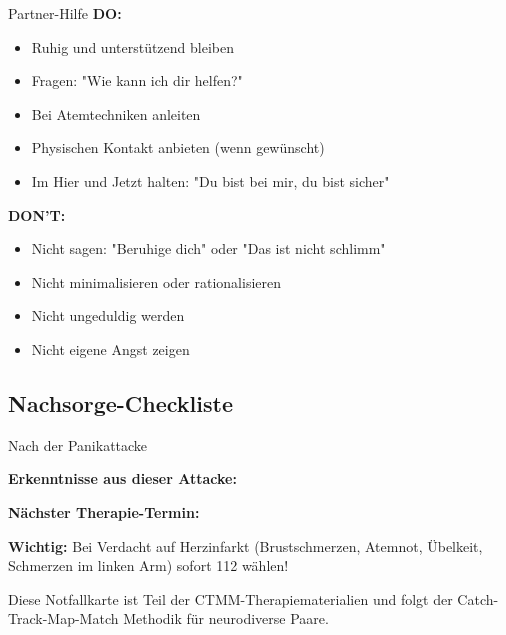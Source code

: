 \begin{ctmmPurpleBox}{Partner-Hilfe}
\textbf{DO:}
\begin{itemize}
\item Ruhig und unterstützend bleiben
\item Fragen: "Wie kann ich dir helfen?"
\item Bei Atemtechniken anleiten
\item Physischen Kontakt anbieten (wenn gewünscht)
\item Im Hier und Jetzt halten: "Du bist bei mir, du bist sicher"
\end{itemize}

\textbf{DON'T:}
\begin{itemize}
\item Nicht sagen: "Beruhige dich" oder "Das ist nicht schlimm"
\item Nicht minimalisieren oder rationalisieren
\item Nicht ungeduldig werden
\item Nicht eigene Angst zeigen
\end{itemize}
\end{ctmmPurpleBox}

\subsection{Nachsorge-Checkliste}

\begin{ctmmGreenBox}{Nach der Panikattacke}





\textbf{Erkenntnisse aus dieser Attacke:} 

\textbf{Nächster Therapie-Termin:} 
\end{ctmmGreenBox}

\textcolor{ctmmRed}{\small \textbf{Wichtig:} Bei Verdacht auf Herzinfarkt (Brustschmerzen, Atemnot, Übelkeit, Schmerzen im linken Arm) sofort 112 wählen!}

\textcolor{ctmmGray}{\small Diese Notfallkarte ist Teil der CTMM-Therapiematerialien und folgt der Catch-Track-Map-Match Methodik für neurodiverse Paare.}
